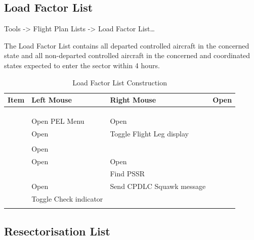 \documentclass[a4paper,oneside,11pt]{memoir}
\begin{document}
\subsection{Load Factor List}
\label{list:load}

 Tools -> Flight Plan Lists -> Load Factor List…

\bigskip

The Load Factor List contains all departed controlled aircraft in the concerned state and all non-departed controlled aircraft in the concerned and coordinated states expected to enter the sector within 4 hours.

\begin{longtable}{|p{}|p{}|p{}|} \hline
  \textbf{Item}         & \textbf{Left Mouse}     & \textbf{Right Mouse}      \endhead \hline
   & Open    &                           \\ \hline
       &                         &                           \\ \hline
          &                         &                           \\ \hline
        &                         &                           \\ \hline
        & Open PEL Menu           & Open      \\ \hline
       & Open   & Toggle Flight Leg display \\ \hline
       &                         &                           \\ \hline
       & Open    &                           \\ \hline
        & Open   & Open    \\ \hline
       &                         & Find PSSR                 \\ \hline
       & Open  & Send CPDLC Squawk message \\ \hline
          & Toggle Check indicator  &                           \\ \hline
  \caption{Load Factor List Construction}
\end{longtable}  

\subsection{Resectorisation List}
\label{list:resec}
\end{document}
